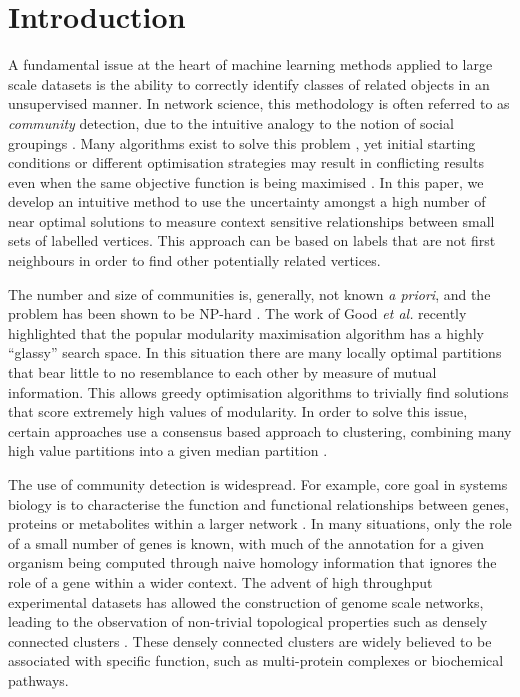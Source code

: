 \documentclass[sigconf]{acmart}
\begin{document}
\section{Introduction}

A fundamental issue at the heart of machine learning methods applied to large scale datasets is the ability to correctly identify classes of related objects in an unsupervised manner.
In network science, this methodology is often referred to as \textit{community} detection, due to the intuitive analogy to the notion of social groupings \cite{fortunato2010community}.
Many algorithms exist to solve this problem \cite{fortunato2016community}, yet initial starting conditions or different optimisation strategies may result in conflicting results even when the same objective function is being maximised \cite{good2010performance}.
In this paper, we develop an intuitive method to use the uncertainty amongst a high number of near optimal solutions to measure context sensitive relationships between small sets of labelled vertices.
This approach can be based on labels that are not first neighbours in order to find other potentially related vertices.

The number and size of communities is, generally, not known \textit{a priori}, and the problem has been shown to be NP-hard \cite{npHardModularity}.
The work of Good \textit{et al.} \cite{good2010performance} recently highlighted that the popular modularity maximisation algorithm has a highly ``glassy'' search space.
In this situation there are many locally optimal partitions that bear little to no resemblance to each other by measure of mutual information.
This allows greedy optimisation algorithms \cite{blondel2008fast} to trivially find solutions that score extremely high values of modularity.
In order to solve this issue, certain approaches use a consensus based approach to clustering, combining many high value partitions into a given median partition \cite{lancichinetti2012consensus}.

The use of community detection is widespread.
For example, core goal in systems biology is to characterise the function and functional relationships between genes, proteins or metabolites within a larger network \cite{girvan2002community}.
In many situations, only the role of a small number of genes is known, with much of the annotation for a given organism being computed through naive homology information that ignores the role of a gene within a wider context.
The advent of high throughput experimental datasets has allowed the construction of genome scale networks, leading to the observation of non-trivial topological properties such as densely connected clusters \cite{ArabidopsisConsortium2011}.
These densely connected clusters are widely believed to be associated with specific function, such as multi-protein complexes or biochemical pathways.
\end{document}
